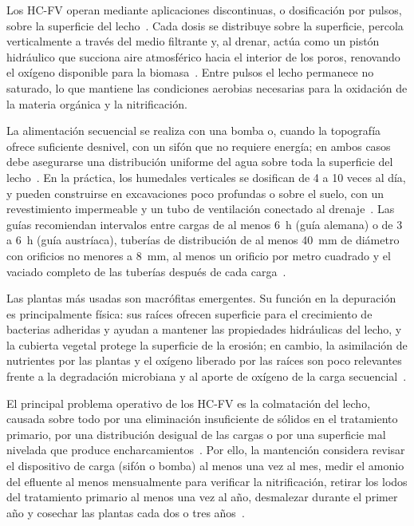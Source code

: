 Los HC-FV operan mediante aplicaciones discontinuas, o dosificación por pulsos, sobre la superficie del lecho~\parencite{dotro2021humedales,brix2005use}.
Cada dosis se distribuye sobre la superficie, percola verticalmente a través del medio filtrante y, al drenar, actúa como un pistón hidráulico que succiona aire atmosférico hacia el interior de los poros, renovando el oxígeno disponible para la biomasa~\parencite{dotro2021humedales}.
Entre pulsos el lecho permanece no saturado, lo que mantiene las condiciones aerobias necesarias para la oxidación de la materia orgánica y la nitrificación.

La alimentación secuencial se realiza con una bomba o, cuando la topografía ofrece suficiente desnivel, con un sifón que no requiere energía; en ambos casos debe asegurarse una distribución uniforme del agua sobre toda la superficie del lecho~\parencite{dotro2021humedales}.
En la práctica, los humedales verticales se dosifican de 4 a 10 veces al día, y pueden construirse en excavaciones poco profundas o sobre el suelo, con un revestimiento impermeable y un tubo de ventilación conectado al drenaje~\parencite{reuter2022compendio}.
Las guías recomiendan intervalos entre cargas de al menos \qty{6}{\hour} (guía alemana) o de 3 a \qty{6}{\hour} (guía austríaca), tuberías de distribución de al menos \qty{40}{\milli\meter} de diámetro con orificios no menores a \qty{8}{\milli\meter}, al menos un orificio por metro cuadrado y el vaciado completo de las tuberías después de cada carga~\parencite{dotro2021humedales}.

Las plantas más usadas son macrófitas emergentes.
Su función en la depuración es principalmente física: sus raíces ofrecen superficie para el crecimiento de bacterias adheridas y ayudan a mantener las propiedades hidráulicas del lecho, y la cubierta vegetal protege la superficie de la erosión; en cambio, la asimilación de nutrientes por las plantas y el oxígeno liberado por las raíces son poco relevantes frente a la degradación microbiana y al aporte de oxígeno de la carga secuencial~\parencite{dotro2021humedales}.

El principal problema operativo de los HC-FV es la colmatación del lecho, causada sobre todo por una eliminación insuficiente de sólidos en el tratamiento primario, por una distribución desigual de las cargas o por una superficie mal nivelada que produce encharcamientos~\parencite{dotro2021humedales}.
Por ello, la mantención considera revisar el dispositivo de carga (sifón o bomba) al menos una vez al mes, medir el amonio del efluente al menos mensualmente para verificar la nitrificación, retirar los lodos del tratamiento primario al menos una vez al año, desmalezar durante el primer año y cosechar las plantas cada dos o tres años~\parencite{dotro2021humedales}.

